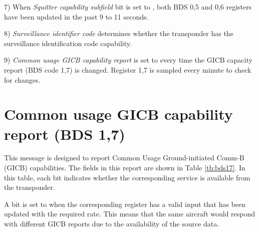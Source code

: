 7) When \emph{Squitter capability subfield} bit is set to \1, both BDS 0,5 and 0,6 registers have been updated in the past 9 to 11 seconds.

8) \emph{Surveillance identifier code} determines whether the transponder has the surveillance identification code capability.

9) \emph{Common usage GICB capability report} is set to \1 every time the GICB capacity report (BDS code 1,7) is changed. Register 1,7 is sampled every minute to check for changes.



\newpage

\section{Common usage GICB capability report (BDS 1,7)}

This message is designed to report Common Usage Ground-initiated Comm-B (GICB) capabilities. The fields in this report are shown in Table \ref{tb:bds17}. In this table, each bit indicates whether the corresponding service is available from the transponder. 

A bit is set to \1 when the corresponding register has a valid input that has been updated with the required rate. This means that the same aircraft would respond with different GICB reports due to the availability of the source data.

